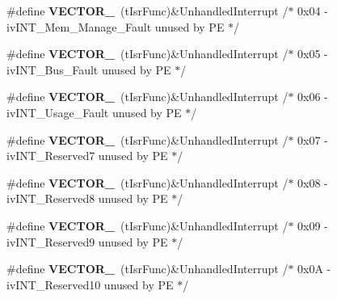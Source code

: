 \begin{DoxyCompactItemize}
\item 
\#define {\bfseries V\+E\+C\+T\+O\+R\+\_}~(t\+Isr\+Func)\&Unhandled\+Interrupt         /$\ast$ 0x04 -\/    iv\+I\+N\+T\+\_\+\+Mem\+\_\+\+Manage\+\_\+\+Fault         unused by P\+E $\ast$/\hypertarget{group___vectors___config__module_ga9d4290488014b4c0fa7f7471586c8271}{}\label{group___vectors___config__module_ga9d4290488014b4c0fa7f7471586c8271}

\item 
\#define {\bfseries V\+E\+C\+T\+O\+R\+\_}~(t\+Isr\+Func)\&Unhandled\+Interrupt         /$\ast$ 0x05 -\/    iv\+I\+N\+T\+\_\+\+Bus\+\_\+\+Fault                unused by P\+E $\ast$/\hypertarget{group___vectors___config__module_gac75a6110f89d3f34a5aab0f3cbb28748}{}\label{group___vectors___config__module_gac75a6110f89d3f34a5aab0f3cbb28748}

\item 
\#define {\bfseries V\+E\+C\+T\+O\+R\+\_}~(t\+Isr\+Func)\&Unhandled\+Interrupt         /$\ast$ 0x06 -\/    iv\+I\+N\+T\+\_\+\+Usage\+\_\+\+Fault              unused by P\+E $\ast$/\hypertarget{group___vectors___config__module_gaef90142e11537f4811767198038d51f8}{}\label{group___vectors___config__module_gaef90142e11537f4811767198038d51f8}

\item 
\#define {\bfseries V\+E\+C\+T\+O\+R\+\_}~(t\+Isr\+Func)\&Unhandled\+Interrupt         /$\ast$ 0x07 -\/    iv\+I\+N\+T\+\_\+\+Reserved7                unused by P\+E $\ast$/\hypertarget{group___vectors___config__module_ga0472a7d5c47fb836c416fb4f7951ce9b}{}\label{group___vectors___config__module_ga0472a7d5c47fb836c416fb4f7951ce9b}

\item 
\#define {\bfseries V\+E\+C\+T\+O\+R\+\_}~(t\+Isr\+Func)\&Unhandled\+Interrupt         /$\ast$ 0x08 -\/    iv\+I\+N\+T\+\_\+\+Reserved8                unused by P\+E $\ast$/\hypertarget{group___vectors___config__module_ga9cc5438d434e94a4b84de99f877503af}{}\label{group___vectors___config__module_ga9cc5438d434e94a4b84de99f877503af}

\item 
\#define {\bfseries V\+E\+C\+T\+O\+R\+\_}~(t\+Isr\+Func)\&Unhandled\+Interrupt         /$\ast$ 0x09 -\/    iv\+I\+N\+T\+\_\+\+Reserved9                unused by P\+E $\ast$/\hypertarget{group___vectors___config__module_ga9c6ad473364f8e083696c60007fe8e13}{}\label{group___vectors___config__module_ga9c6ad473364f8e083696c60007fe8e13}

\item 
\#define {\bfseries V\+E\+C\+T\+O\+R\+\_}~(t\+Isr\+Func)\&Unhandled\+Interrupt         /$\ast$ 0x0\+A -\/    iv\+I\+N\+T\+\_\+\+Reserved10               unused by P\+E $\ast$/\hypertarget{group___vectors___config__module_ga4e33673b419006fb4fa0e373e4ad460d}{}\label{group___vectors___config__module_ga4e33673b419006fb4fa0e373e4ad460d}


\end{DoxyCompactItemize}
